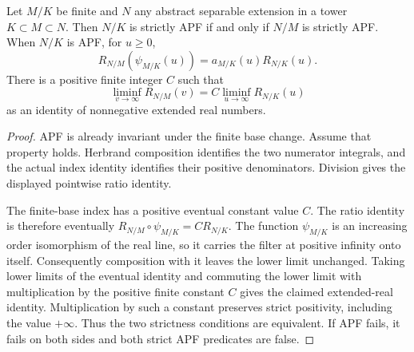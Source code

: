 \begin{proposition}
\label{fw:strict-apf-finite-base}
\leanok
Let $M/K$ be finite and $N$ any abstract separable extension in a tower
$K\subset M\subset N$. Then $N/K$ is strictly APF if and only if $N/M$
is strictly APF. When $N/K$ is APF, for $u\geq0$,
\[
 R_{N/M}(\psi_{M/K}(u))=a_{M/K}(u)R_{N/K}(u).
\]
There is a positive finite integer $C$ such that
\[
 \liminf_{v\to\infty}R_{N/M}(v)
   =C\liminf_{u\to\infty}R_{N/K}(u)
\]
as an identity of nonnegative extended real numbers.
\end{proposition}
\begin{proof}
APF is already invariant under the finite base change. Assume that
property holds. Herbrand composition identifies the two numerator
integrals, and the actual index identity identifies their positive
denominators. Division gives the displayed pointwise ratio identity.

The finite-base index has a positive eventual constant value $C$.
The ratio identity is therefore eventually
$R_{N/M}\circ\psi_{M/K}=C R_{N/K}$.
The function $\psi_{M/K}$ is an increasing order isomorphism of the
real line, so it carries the filter at positive infinity onto itself.
Consequently composition with it leaves the lower limit unchanged.
Taking lower limits of the eventual identity and commuting the lower
limit with multiplication by the positive finite constant $C$ gives
the claimed extended-real identity. Multiplication by such a constant
preserves strict positivity, including the value $+\infty$. Thus the
two strictness conditions are equivalent. If APF fails, it fails on
both sides and both strict APF predicates are false.
\end{proof}

